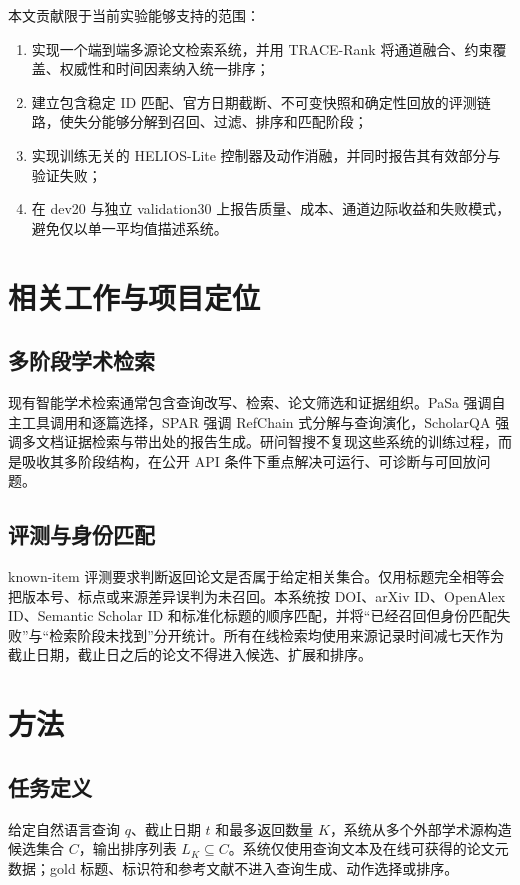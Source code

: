 \documentclass[a4paper,11pt]{ctexart}
\begin{document}
本文贡献限于当前实验能够支持的范围：
\begin{enumerate}[leftmargin=2em]
  \item 实现一个端到端多源论文检索系统，并用 TRACE-Rank 将通道融合、约束覆盖、权威性和时间因素纳入统一排序；
  \item 建立包含稳定 ID 匹配、官方日期截断、不可变快照和确定性回放的评测链路，使失分能够分解到召回、过滤、排序和匹配阶段；
  \item 实现训练无关的 HELIOS-Lite 控制器及动作消融，并同时报告其有效部分与验证失败；
  \item 在 dev20 与独立 validation30 上报告质量、成本、通道边际收益和失败模式，避免仅以单一平均值描述系统。
\end{enumerate}

\section{相关工作与项目定位}
\subsection{多阶段学术检索}
现有智能学术检索通常包含查询改写、检索、论文筛选和证据组织。PaSa 强调自主工具调用和逐篇选择，SPAR 强调 RefChain 式分解与查询演化，ScholarQA 强调多文档证据检索与带出处的报告生成。研问智搜不复现这些系统的训练过程，而是吸收其多阶段结构，在公开 API 条件下重点解决可运行、可诊断与可回放问题。

\subsection{评测与身份匹配}
known-item 评测要求判断返回论文是否属于给定相关集合。仅用标题完全相等会把版本号、标点或来源差异误判为未召回。本系统按 DOI、arXiv ID、OpenAlex ID、Semantic Scholar ID 和标准化标题的顺序匹配，并将“已经召回但身份匹配失败”与“检索阶段未找到”分开统计。所有在线检索均使用来源记录时间减七天作为截止日期，截止日之后的论文不得进入候选、扩展和排序。

\section{方法}
\subsection{任务定义}
给定自然语言查询 $q$、截止日期 $t$ 和最多返回数量 $K$，系统从多个外部学术源构造候选集合 $C$，输出排序列表 $L_K\subseteq C$。系统仅使用查询文本及在线可获得的论文元数据；gold 标题、标识符和参考文献不进入查询生成、动作选择或排序。
\end{document}
